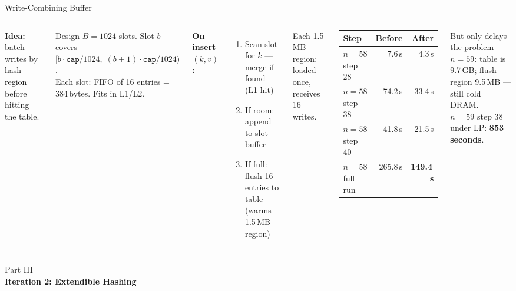 \documentclass[aspectratio=169,t]{beamer}
\begin{document}
\begin{frame}{Write-Combining Buffer}
\small
\begin{columns}[c]
\textbf{Idea:} batch writes by hash region before hitting the table.

\vspace{0.1cm}
\begin{block}{Design}
$B=1024$ slots. Slot $b$ covers $[b\cdot\texttt{cap}/1024,\;(b{+}1)\cdot\texttt{cap}/1024)$.\\[2pt]
Each slot: FIFO of 16 entries = 384\,bytes. Fits in L1/L2.
\end{block}

\vspace{0.1cm}
\textbf{On insert $(k, v)$:}
\begin{enumerate}\small
  \item Scan slot for $k$ — merge if found (L1 hit)
  \item If room: append to slot buffer
  \item If full: flush 16 entries to table (warms 1.5\,MB region)
\end{enumerate}
Each 1.5\,MB region: loaded once, receives 16 writes.

\begin{center}
\begin{tabular}{lrr}
\toprule
Step & Before & After \\
\midrule
$n=58$ step 28 & 7.6\,s & 4.3\,s \\
$n=58$ step 38 & 74.2\,s & 33.4\,s \\
$n=58$ step 40 & 41.8\,s & 21.5\,s \\
\midrule
$n=58$ full run & 265.8\,s & \textbf{149.4\,s} \\
\bottomrule
\end{tabular}
\end{center}

\vspace{0.2cm}
\begin{alertblock}{But only delays the problem}
  $n=59$: table is 9.7\,GB; flush region 9.5\,MB — still cold DRAM.\\[3pt]
  $n=59$ step 38 under LP: \textbf{853 seconds}.
\end{alertblock}
\end{columns}
\end{frame}

{
\begin{frame}[plain]
  \vspace{2cm}
  \begin{center}
    {\color{lightblue}\small Part III}\\[0.4cm]
    {\color{white}\LARGE\bfseries Iteration 2: Extendible Hashing}
  \end{center}
\end{frame}
}
\end{document}
